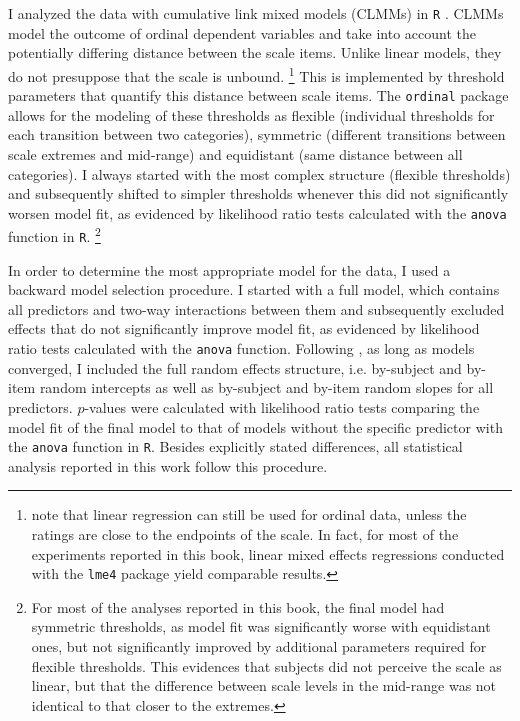 I analyzed the data with cumulative link mixed models (CLMMs) \citep{christensen2015} in \texttt{R} \citep{rcoreteam2019}. CLMMs model the outcome of ordinal dependent variables and take into account the potentially differing distance between the scale items. Unlike linear models, they do not presuppose that the scale is unbound.%
%
\footnote{\citet[28]{gibson.etal2011} note that linear regression can still be used for ordinal data, unless the ratings are close to the endpoints of the scale. In fact, for most of the experiments reported in this book, linear mixed effects regressions conducted with the \texttt{lme4} package \citep{bates.etal2015} yield comparable results.}\afterfn%
%
This is implemented by threshold parameters that quantify this distance between scale items. The \texttt{ordinal} package allows for the modeling of these thresholds as flexible (individual thresholds for each transition between two categories), symmetric (different transitions between scale extremes and mid-range) and equidistant (same distance between all categories). I always started with the most complex structure (flexible thresholds) and subsequently shifted to simpler thresholds whenever this did not significantly worsen model fit, as evidenced by likelihood ratio tests calculated with the \texttt{anova} function in \texttt{R}.%
%
\footnote{For most of the analyses reported in this book, the final model had symmetric thresholds, as model fit was significantly worse with equidistant ones, but not significantly improved by additional parameters required for flexible thresholds. This evidences that subjects did not perceive the scale as linear, but that the difference between scale levels in the mid-range was not identical to that closer to the extremes.}\afterfn%
%

In order to determine the most appropriate model for the data, I used a backward model selection procedure. I started with a full model, which contains all predictors and two-way interactions between them and subsequently excluded effects that do not significantly improve model fit, as evidenced by likelihood ratio tests calculated with the \texttt{anova} function. Following \citet{barr.etal2013}, as long as models converged, I included the full random effects structure, i.e. by-subject and by-item random intercepts as well as by-subject and by-item random slopes for all predictors. $p$-values were calculated with likelihood ratio tests comparing the model fit of the final model to that of models without the specific predictor with the \texttt{anova} function in \texttt{R}. Besides explicitly stated differences, all statistical analysis reported in this work follow this procedure.

